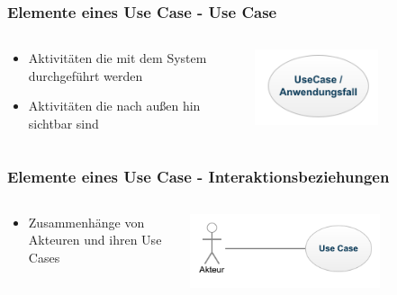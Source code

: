 \begin{frame}
\frametitle{Elemente eines Use Case - Use Case}
	\begin{columns}
		\begin{column}{.6\textwidth}
			\begin{itemize}
				\item Aktivitäten die mit dem System durchgeführt werden
				\item Aktivitäten die nach außen hin sichtbar sind
			\end{itemize}
		\end{column}
		\begin{column}{.4\textwidth}
			\center
			\includegraphics[width=0.6\textwidth,
			keepaspectratio=true]{bilder/use_case.png}
		\end{column}
	\end{columns}
\end{frame}

\begin{frame}
\frametitle{Elemente eines Use Case - Interaktionsbeziehungen}
	\begin{columns}
		\begin{column}{.4\textwidth}
			\begin{itemize}
				\item Zusammenhänge von Akteuren und ihren Use Cases
			\end{itemize}
		\end{column}
		\begin{column}{.6\textwidth}
			\center
			\includegraphics[width=0.7\textwidth,
			keepaspectratio=true]{bilder/interaktionsbeziehung.png}
		\end{column}
	\end{columns}
\end{frame}


